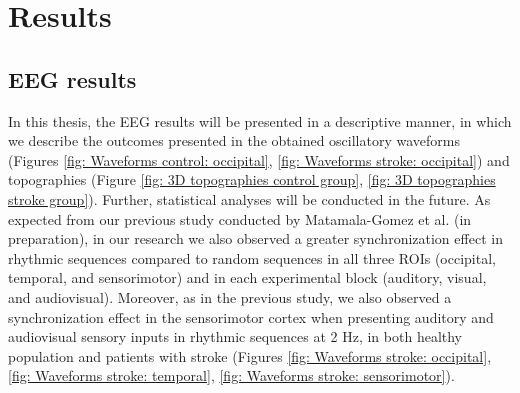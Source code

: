 \chapter{Results}
\section{EEG results}
In this thesis, the EEG results will be presented in a descriptive manner, in which we describe the outcomes presented in the obtained oscillatory waveforms (Figures \ref{fig: Waveforms control: occipital}, \ref{fig: Waveforms stroke: occipital}) and topographies (Figure \ref{fig: 3D topographies control group}, \ref{fig: 3D topographies stroke group}). Further, statistical analyses will be conducted in the future.  
As expected from our previous study conducted by Matamala-Gomez et al. (in preparation), in our research we also observed a greater synchronization effect in rhythmic sequences compared to random sequences in all three ROIs (occipital, temporal, and sensorimotor) and in each experimental block (auditory, visual, and audiovisual). Moreover, as in the previous study, we also observed a synchronization effect in the sensorimotor cortex when presenting auditory and audiovisual sensory inputs in rhythmic sequences at 2 Hz, in both healthy population and patients with stroke (Figures \ref{fig: Waveforms stroke: occipital}, \ref{fig: Waveforms stroke: temporal}, \ref{fig: Waveforms stroke: sensorimotor}). 

